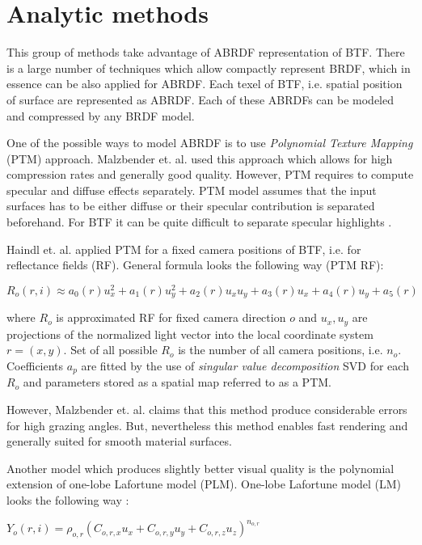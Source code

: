  \section{Analytic methods}
\label{section:analytic_methods}	
 This group of methods take advantage of ABRDF representation of BTF. 
 There is a large number of techniques which allow compactly represent BRDF, which in essence can be also applied for ABRDF.
 Each texel of BTF, i.e. spatial position of surface are represented as ABRDF. Each of these ABRDFs can be modeled and compressed by any BRDF model.
 
One of the possible ways to model ABRDF is to use \emph{Polynomial Texture  Mapping} (PTM) approach.
Malzbender et. al. \cite{PTM} used this approach which allows for high compression rates and generally good quality. 
However, PTM requires to compute specular and diffuse effects separately. 
PTM model assumes that the input surfaces has to be either diffuse or their specular contribution is separated beforehand.
For BTF it can be quite difficult to separate specular highlights \cite{haindl}.

Haindl et. al. \cite{haindl} applied PTM for a fixed camera positions of BTF, i.e. for reflectance fields (RF).
General formula looks the following way (PTM RF):

{\centering$R_{o}(r,i)\approx a_{0}(r)u_{x}^2+a_{1}(r)u_{y}^2+a_{2}(r)u_{x}u_{y}+a_{3}(r)u_{x}+a_{4}(r)u_{y}+a_{5}(r)$\\}

 where $R_{o}$ is approximated RF for fixed camera direction $o$ and $u_{x},u_{y}$ are projections of the normalized light vector into the local coordinate system $r=(x,y)$.
 Set of all possible $R_{o}$ is the number of all camera positions, i.e. $n_{o}$. 
 Coefficients $a_{p}$ are fitted by the use of \emph{singular value decomposition} SVD for each $R_{o}$ and parameters stored as a spatial map referred to as a PTM.
 
 However, Malzbender et. al. \cite{PTM} claims that this method produce considerable errors for high grazing angles. 
 But, nevertheless this method enables fast rendering and generally suited for smooth material surfaces.
 
 Another model which produces slightly better visual quality is the polynomial extension of one-lobe Lafortune model (PLM).
One-lobe Lafortune model (LM) looks the following way \cite{plm}:

{\centering$Y_{o} (r,i) = \rho_{o,r}(C_{o,r,x}u_{x}+C_{o,r,y}u_{y}+C_{o,r,z}u_{z})_{ }^{n_{o,r}}$\\}

